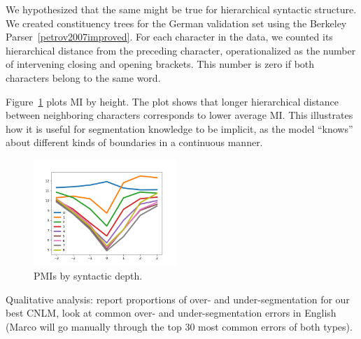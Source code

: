 We hypothesized that the same might be true for hierarchical syntactic structure.
We created constituency trees for the German validation set using the Berkeley Parser~\ref{petrov2007improved}.
For each character in the data, we counted its hierarchical distance from the preceding character, operationalized as the number of intervening closing and opening brackets.
This number is zero if both characters belong to the same word.

Figure~\ref{fig:syntax-depth} plots MI by height.
The plot shows that longer hierarchical distance between neighboring characters corresponds to lower average MI.
This illustrates how it is useful for
segmentation knowledge to be implicit, as the model ``knows'' about
different kinds of boundaries in a continuous manner.



\begin{figure}
\includegraphics[width=0.48\textwidth]{figures/segmentation-profile-pmis-german-all-heights.png}
\caption{PMIs by syntactic depth.}\label{fig:syntax-depth}
\end{figure}




Qualitative analysis: report proportions of over- and
under-segmentation for our best CNLM, look at common over- and
under-segmentation errors in English (Marco will go manually
through the top 30 most common errors of both types).
